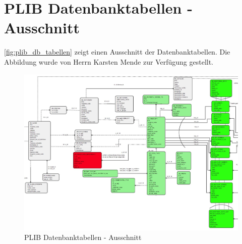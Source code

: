 \chapter{PLIB Datenbanktabellen - Ausschnitt}\label{kap:anh_plib_db}

\autoref{fig:plib_db_tabellen} zeigt einen Ausschnitt der Datenbanktabellen. Die Abbildung wurde von Herrn Karsten Mende zur Verfügung gestellt. 

\begin{figure}[htbp]
	\centering
		\includegraphics[height=0.98\textwidth, angle=90]{images/plib_datenbankausschnitt.jpg}
	\caption{PLIB Datenbanktabellen - Ausschnitt}
	\label{fig:plib_db_tabellen}
\end{figure}